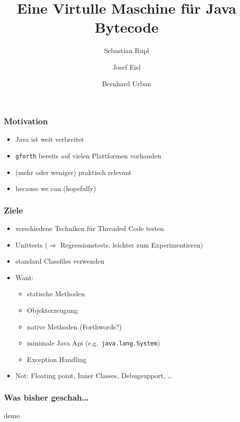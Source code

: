 \documentclass{beamer}
\title[Stackbasierte Programmiersprachen (WS2011)]{Eine Virtulle Maschine f\"ur Java Bytecode}
\author{Sebastian Rupl \and Josef Eisl \and Bernhard Urban}
\begin{document}
\frame{\titlepage}
\begin{frame}
	\frametitle{Motivation}
	\begin{itemize}
		\item Java ist weit verbreitet
		\item \texttt{gforth} bereits auf vielen Plattformen vorhanden
		\item (mehr oder weniger) praktisch relevant
		\pause\item because we can (hopefully)
	\end{itemize}
\end{frame}
\begin{frame}
	\frametitle{Ziele}
	\begin{itemize}
		\item verschiedene Techniken f\"ur Threaded Code testen
		\item Unittests ($\Rightarrow$ Regressionstests, leichter zum
		Experimentieren)
		\item standard Classfiles verwenden
		\item Want:
		\begin{itemize}
			\item statische Methoden
			\item Objekterzeugung
			\item native Methoden (Forthwords?)
			\item minimale Java Api (e.g.\ \texttt{java.lang.System})
			\item Exception Handling
		\end{itemize}
		\item Not: Floating point, Inner Classes, Debugsupport, \dots
	\end{itemize}
\end{frame}
\begin{frame}
	\frametitle{Was bisher geschah\dots}
	\begin{center}
		demo
	\end{center}
\end{frame}
\end{document}
